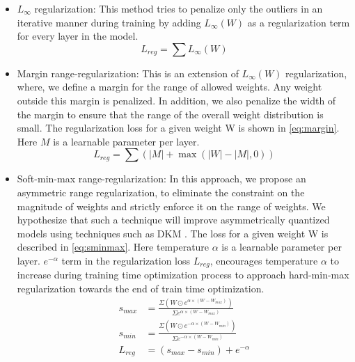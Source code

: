 \documentclass[10pt,twocolumn,letterpaper]{article}
\begin{document}
\begin{itemize}
    \item $L_\infty$ regularization: This method tries to penalize only the outliers in an iterative manner during training by adding $L_{\infty}(W)$ as a regularization term for every layer in the model.
    \begin{equation}
         L_{reg}=\sum L_{\infty}(W)
    \end{equation}
    \item Margin range-regularization: This is an extension of $L_{\infty}(W)$ regularization, where, we define a margin for the range of allowed weights. Any weight outside this margin is penalized. In addition, we also penalize the width of the margin to ensure that the range of the overall weight distribution is small. The regularization loss for a given weight W is shown in \cref{eq:margin}. Here $M$ is a learnable parameter per layer.
    \begin{equation}
        L_{reg}=\sum (|M| + \max(|W|-|M|,0))
        \label{eq:margin}
    \end{equation}
    \item Soft-min-max range-regularization: In this approach, we propose an asymmetric range regularization, to eliminate the constraint on the magnitude of weights and strictly enforce it on the range of weights. We hypothesize that such a technique will improve asymmetrically quantized models using techniques such as DKM \cite{cho2021dkm}. The loss for a given weight W is described in \cref{eq:sminmax}. Here temperature $\alpha$ is a learnable parameter per layer. $e^{-\alpha}$ term in the regularization loss $L_{reg}$, encourages temperature $\alpha$ to increase during training time optimization process to approach hard-min-max regularization towards the end of train time optimization.
    \begin{equation}
    \begin{split}
        s_{max} &= \frac{\Sigma (W \odot e^{\alpha \times (W-W_{max})})}{\Sigma e^{\alpha \times (W-W_{max})}} \\
        s_{min} &= \frac{\Sigma (W \odot e^{-\alpha \times (W-W_{min})})}{\Sigma e^{-\alpha \times (W-W_{min})}} \\
        L_{reg} &= (s_{max}-s_{min}) + e^{-\alpha}
    \end{split}
    \label{eq:sminmax}
    \end{equation}
\end{itemize}
\end{document}
